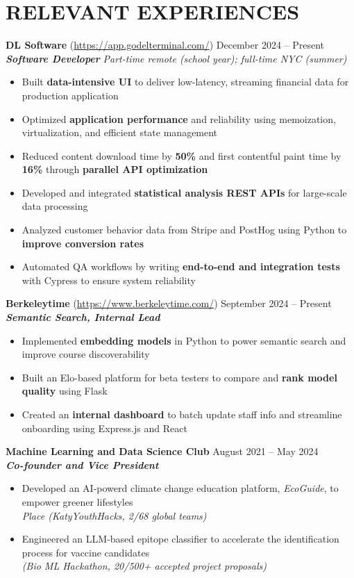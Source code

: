 \section*{RELEVANT EXPERIENCES}

\noindent
\textbf{DL Software} (\href{https://app.godelterminal.com/}{https://app.godelterminal.com/}) \hfill December 2024 -- Present \\
\textbf{\textit{Software Developer}} \hfill \textit{Part-time remote (school year); full-time NYC (summer)}
\begin{itemize}
	\item Built \textbf{data-intensive UI} to deliver low-latency, streaming financial data for production application
	\item Optimized \textbf{application performance} and reliability using memoization, virtualization, and efficient state management
	\item Reduced content download time by \textbf{50\%} and first contentful paint time by \textbf{16\%} through \textbf{parallel API optimization}
	\item Developed and integrated \textbf{statistical analysis REST APIs} for large-scale data processing
	\item Analyzed customer behavior data from Stripe and PostHog using Python to \textbf{improve conversion rates}
	\item Automated QA workflows by writing \textbf{end-to-end and integration tests} with Cypress to ensure system reliability
\end{itemize}

\noindent
\textbf{Berkeleytime} (\href{https://www.berkeleytime.com/}{https://www.berkeleytime.com/}) \hfill September 2024 -- Present \\
\textbf{\textit{Semantic Search, Internal Lead}}
\begin{itemize}
	\item Implemented \textbf{embedding models} in Python to power semantic search and improve course discoverability
	\item Built an Elo-based platform for beta testers to compare and \textbf{rank model quality} using Flask
	\item Created an \textbf{internal dashboard} to batch update staff info and streamline onboarding using Express.js and React
\end{itemize}

\noindent
\textbf{Machine Learning and Data Science Club} \hfill August 2021 -- May 2024 \\
\textbf{\textit{Co-founder and Vice President}}
\begin{itemize}
	\item Developed an AI-powerd climate change education platform, \textit{EcoGuide}, to empower greener lifestyles \\ \textit{ Place (KatyYouthHacks, 2/68 global teams)}
	\item Engineered an LLM-based epitope classifier to accelerate the identification process for vaccine candidates \\ \textit{(Bio ML Hackathon, 20/500+ accepted project proposals)}
\end{itemize}

